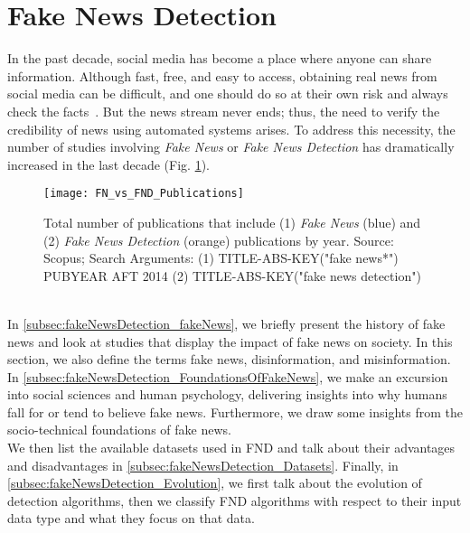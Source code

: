 \section{Fake News Detection}
\label{sec:fakeNewsDetection}
In the past decade, social media has become a place where anyone can share information. Although fast, free, and easy to access, obtaining
real news from social media can be difficult, and one should do so at their own risk and always check the
facts~\parencite{SocialMediaAndFakeNewsIn2016Election_Allcott,TheScienceOfFakeNews_Lazer}. But the news stream never ends; thus, the need to verify the credibility of news using automated systems arises. To address this necessity, the number of studies involving \emph{Fake News} or \emph{Fake News Detection} has dramatically increased in the last decade (Fig. \ref{fig:FN_vs_FND_Publications}).
\begin{figure}
    \centering
    \texttt{[image: FN\_vs\_FND\_Publications]}
    \caption[Fake News and Fake News Detection Publications by Year]{Total number of publications that include (1) \emph{Fake News} (blue) and (2) \emph{Fake News Detection} (orange) publications by year. Source: Scopus; Search Arguments: (1) TITLE-ABS-KEY("fake news*") PUBYEAR AFT 2014 (2) TITLE-ABS-KEY("fake news detection")}\label{fig:FN_vs_FND_Publications}
\end{figure}\\
In \ref{subsec:fakeNewsDetection_fakeNews}, we briefly present the history of fake news and look at studies that display the impact of fake news on society. In this section, we also define the terms fake news, disinformation, and misinformation. \\
In \ref{subsec:fakeNewsDetection_FoundationsOfFakeNews}, we make an excursion into social sciences and human psychology, delivering insights into why humans fall for or tend to believe fake news. Furthermore, we draw some insights from the socio-technical foundations of fake news.\\
We then list the available datasets used in FND and talk about their advantages and disadvantages in \ref{subsec:fakeNewsDetection_Datasets}. Finally, in \ref{subsec:fakeNewsDetection_Evolution}, we first talk about the evolution of detection algorithms, then we classify FND algorithms with respect to their input data type and what they focus on that data.\\
